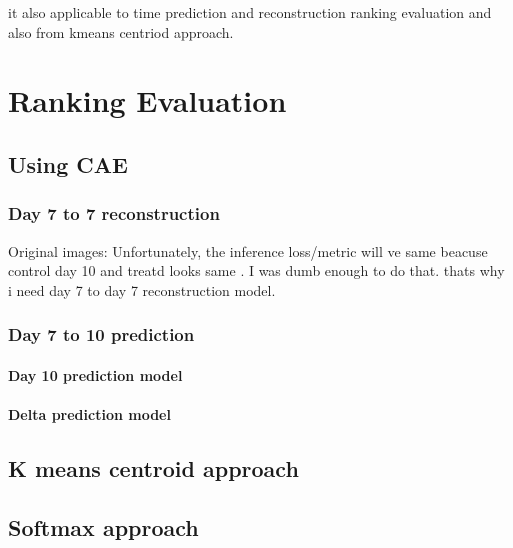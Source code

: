 it also applicable to time prediction and reconstruction ranking evaluation and also from kmeans centriod approach.



\section{Ranking Evaluation}

\subsection{Using CAE} \label{subection:Using CAE}
\subsubsection{Day 7 to 7 reconstruction} \label{subsubection:Day 7 to 7 reconstruction}
Original images: Unfortunately, the inference loss/metric will ve same beacuse control day 10 and treatd looks same . I was dumb enough to do that. thats why i need  day 7 to day 7 reconstruction model.
\subsubsection{Day 7 to 10 prediction} \label{subsubection:Day 7 to 10 prediction}
\paragraph{Day 10 prediction model} \label{paragraph:Day 10 prediction model}
\paragraph{Delta prediction model} \label{paragraph:delta prediction}
\subsection{K means centroid approach} \label{subsection:kmeanscentroidapproach}
\subsection{Softmax approach} \label{subsection:kmeanscentroid}




